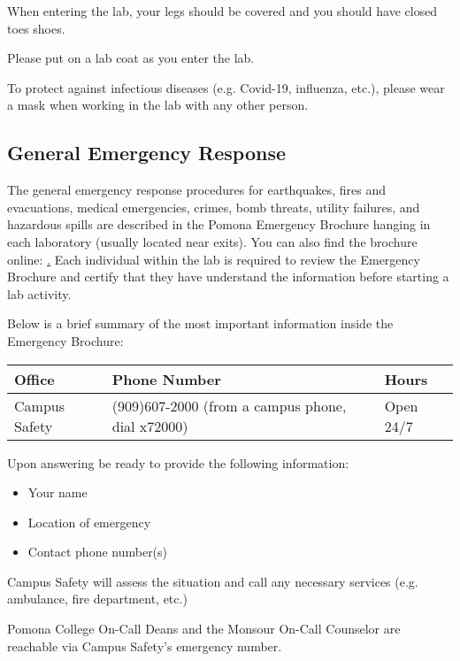 \documentclass[12pt]{../SOP4_alpha}\usepackage[]{graphicx}\usepackage[]{xcolor}
\begin{document}
\NP When entering the lab, your legs should be covered and you should have closed toes shoes. 

\NP Please put on a lab coat as you enter the lab. 

\NP To protect against infectious diseases (e.g. Covid-19, influenza, etc.), please wear a mask when working in the lab with any other person. 

\subsection*{General Emergency Response}

\NP The general emergency response procedures for earthquakes, fires and evacuations, medical emergencies, crimes, bomb threats, utility failures, and hazardous spills are described in the Pomona Emergency Brochure hanging in each laboratory (usually located near exits). You can also find the brochure online: \href{http://www.pomona.edu/sites/default/files/emergency-instructions.pdf}. Each individual within the lab is required to review the Emergency Brochure and certify that they have understand the information before starting a lab activity.

\NP Below is a brief summary of the most important information inside the Emergency Brochure: 

\begin{table}
\begin{tabular}{lll} \hline
Office            & Phone Number & Hours \\ \hline\hline
Campus Safety     & (909)607-2000 (from a campus phone, dial x72000) & Open 24/7 \\ \hline
\end{tabular}
\end{table}

\NP Upon answering be ready to provide the following information:

\begin{itemize}
  \item Your name
  \item Location of emergency
  \item Contact phone number(s)
\end{itemize}

\NP Campus Safety will assess the situation and call any necessary services (e.g. ambulance, fire department, etc.)

\NP Pomona College On-Call Deans and the Monsour On-Call Counselor are reachable via Campus Safety's emergency number. 
\end{document}
